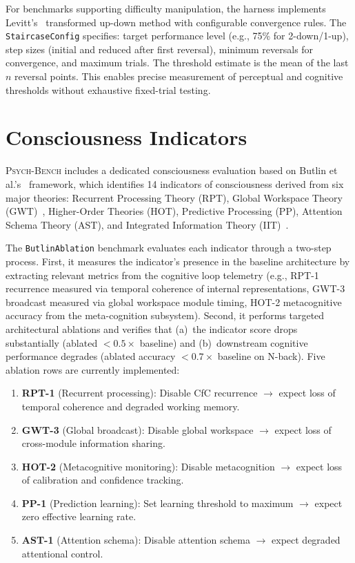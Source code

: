 \documentclass[11pt,letterpaper]{article}
\newcommand{\psychbench}{\textsc{Psych-Bench}}
\begin{document}
For benchmarks supporting difficulty manipulation, the harness implements Levitt's~\citep{levitt1971transformed} transformed up-down method with configurable convergence rules. The \texttt{StaircaseConfig} specifies: target performance level (e.g., 75\% for 2-down/1-up), step sizes (initial and reduced after first reversal), minimum reversals for convergence, and maximum trials. The threshold estimate is the mean of the last $n$ reversal points. This enables precise measurement of perceptual and cognitive thresholds without exhaustive fixed-trial testing.

\section{Consciousness Indicators}
\label{sec:consciousness}

\psychbench{} includes a dedicated consciousness evaluation based on Butlin et al.'s~\citep{butlin2023consciousness} framework, which identifies 14 indicators of consciousness derived from six major theories: Recurrent Processing Theory (RPT), Global Workspace Theory (GWT)~\citep{baars1988cognitive}, Higher-Order Theories (HOT), Predictive Processing (PP), Attention Schema Theory (AST), and Integrated Information Theory (IIT)~\citep{tononi2004information,oizumi2014phenomenology}.

The \texttt{ButlinAblation} benchmark evaluates each indicator through a two-step process. First, it measures the indicator's presence in the baseline architecture by extracting relevant metrics from the cognitive loop telemetry (e.g., RPT-1 recurrence measured via temporal coherence of internal representations, GWT-3 broadcast measured via global workspace module timing, HOT-2 metacognitive accuracy from the meta-cognition subsystem). Second, it performs targeted architectural ablations and verifies that (a)~the indicator score drops substantially (ablated $< 0.5 \times$ baseline) and (b)~downstream cognitive performance degrades (ablated accuracy $< 0.7 \times$ baseline on N-back). Five ablation rows are currently implemented:

\begin{enumerate}[nosep]
    \item \textbf{RPT-1} (Recurrent processing): Disable CfC recurrence $\to$ expect loss of temporal coherence and degraded working memory.
    \item \textbf{GWT-3} (Global broadcast): Disable global workspace $\to$ expect loss of cross-module information sharing.
    \item \textbf{HOT-2} (Metacognitive monitoring): Disable metacognition $\to$ expect loss of calibration and confidence tracking.
    \item \textbf{PP-1} (Prediction learning): Set learning threshold to maximum $\to$ expect zero effective learning rate.
    \item \textbf{AST-1} (Attention schema): Disable attention schema $\to$ expect degraded attentional control.
\end{enumerate}
\end{document}
